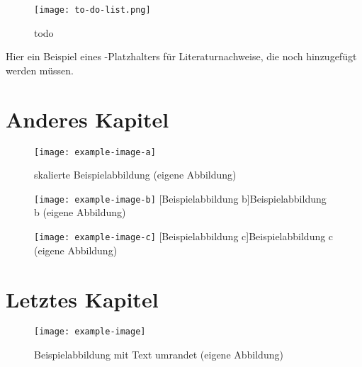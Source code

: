 \begin{figure}[!ht]
    \centering
    \texttt{[image: to-do-list.png]}
    \caption{todo}
    \label{fig:todo}
\end{figure}

\noindent Hier ein Beispiel eines \textcite{todo}-Platzhalters für Literaturnachweise, die noch hinzugefügt werden müssen.

\clearpage

\chapter{Anderes Kapitel}\label{chap:another}

\begin{figure}[!ht]
    \centering
    \texttt{[image: example-image-a]}
    \captionsetup{width=1.0\textwidth}
    \caption[skalierte Beispielabbildung]{skalierte Beispielabbildung (eigene Abbildung)}
    \label{fig:scaledexampleimagea}
\end{figure}

\begin{figure}[!ht]
\centering
    \begin{minipage}[c]{.475\textwidth}
    \centering
        \texttt{[image: example-image-b]}
        [Beispielabbildung b]{Beispielabbildung b (eigene Abbildung)}
        \label{fig:horizontalalignedimageb}
    \end{minipage}\hspace{.025\textwidth}
    \begin{minipage}[c]{.475\textwidth}
        \centering
        \texttt{[image: example-image-c]}
        [Beispielabbildung c]{Beispielabbildung c (eigene Abbildung)}
        \label{fig:horizontalalignedimagec}
    \end{minipage}
\end{figure}

\clearpage

\chapter{Letztes Kapitel}\label{chap:last}

\lipsum[1]

\begin{wrapfigure}{l}{0.4\textwidth}
    \centering
    \texttt{[image: example-image]}
    \captionsetup{width=0.9\linewidth}
    \caption[Beispielabbildung mit Text umrandet]{Beispielabbildung mit Text umrandet (eigene Abbildung)}
    \label{fig:textwrappedaroundexampleimage}
\end{wrapfigure}

